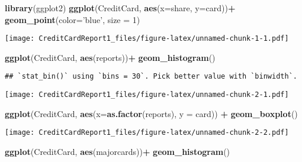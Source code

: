\documentclass[]{article}
\newenvironment{Shaded}{\begin{snugshade}}{\end{snugshade}}
\newcommand{\DataTypeTok}[1]{\textcolor[rgb]{0.13,0.29,0.53}{#1}}
\newcommand{\DecValTok}[1]{\textcolor[rgb]{0.00,0.00,0.81}{#1}}
\newcommand{\KeywordTok}[1]{\textcolor[rgb]{0.13,0.29,0.53}{\textbf{#1}}}
\newcommand{\NormalTok}[1]{#1}
\newcommand{\OperatorTok}[1]{\textcolor[rgb]{0.81,0.36,0.00}{\textbf{#1}}}
\newcommand{\StringTok}[1]{\textcolor[rgb]{0.31,0.60,0.02}{#1}}
\begin{document}
\begin{Shaded}
\begin{Highlighting}[]
\KeywordTok{library}\NormalTok{(ggplot2)}
\KeywordTok{ggplot}\NormalTok{(CreditCard, }\KeywordTok{aes}\NormalTok{(}\DataTypeTok{x=}\NormalTok{share, }\DataTypeTok{y=}\NormalTok{card))}\OperatorTok{+}\StringTok{ }
\StringTok{  }\KeywordTok{geom_point}\NormalTok{(}\DataTypeTok{color=}\StringTok{'blue'}\NormalTok{, }\DataTypeTok{size =} \DecValTok{1}\NormalTok{)}
\end{Highlighting}
\end{Shaded}

\texttt{[image: CreditCardReport1\_files/figure-latex/unnamed-chunk-1-1.pdf]}

\begin{Shaded}
\begin{Highlighting}[]
\KeywordTok{ggplot}\NormalTok{(CreditCard, }\KeywordTok{aes}\NormalTok{(reports))}\OperatorTok{+}\StringTok{ }
\StringTok{  }\KeywordTok{geom_histogram}\NormalTok{()}
\end{Highlighting}
\end{Shaded}

\begin{verbatim}
## `stat_bin()` using `bins = 30`. Pick better value with `binwidth`.
\end{verbatim}

\texttt{[image: CreditCardReport1\_files/figure-latex/unnamed-chunk-2-1.pdf]}

\begin{Shaded}
\begin{Highlighting}[]
\KeywordTok{ggplot}\NormalTok{(CreditCard, }\KeywordTok{aes}\NormalTok{(}\DataTypeTok{x=}\KeywordTok{as.factor}\NormalTok{(reports), }\DataTypeTok{y =}\NormalTok{ card)) }\OperatorTok{+}\StringTok{ }
\KeywordTok{geom_boxplot}\NormalTok{()}
\end{Highlighting}
\end{Shaded}

\texttt{[image: CreditCardReport1\_files/figure-latex/unnamed-chunk-2-2.pdf]}

\begin{Shaded}
\begin{Highlighting}[]
\KeywordTok{ggplot}\NormalTok{(CreditCard, }\KeywordTok{aes}\NormalTok{(majorcards))}\OperatorTok{+}\StringTok{ }
\StringTok{  }\KeywordTok{geom_histogram}\NormalTok{()}
\end{Highlighting}
\end{Shaded}
\end{document}
